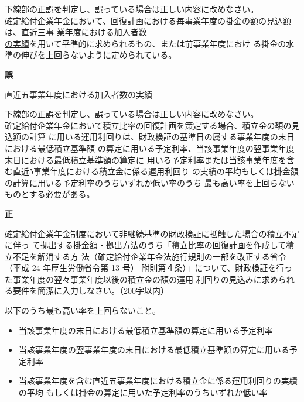 \begin{truefalse}[年金2 2019 問題1(1)\textcircled{4}]
  下線部の正誤を判定し、誤っている場合は正しい内容に改めなさい。
  \\

  確定給付企業年金において、回復計画における毎事業年度の掛金の額の見込額は、\underline{直近三事
業年度における加入者数}\\
\underline{の実績}を用いて平準的に求められるもの、または前事業年度におけ
る掛金の水準の伸びを上回らないように定められている。
\end{truefalse}

\begin{answerbox}
  \textbf{誤}

  直近五事業年度における加入者数の実績
\end{answerbox}

\begin{truefalse}[年金2 H28 問題1(1)\textcircled{2}]
  下線部の正誤を判定し、誤っている場合は正しい内容に改めなさい。
  \\

  確定給付企業年金において積立比率の回復計画を策定する場合、積立金の額の見込額の計算
  に用いる運用利回りは、財政検証の基準日の属する事業年度の末日における最低積立基準額
  の算定に用いる予定利率、当該事業年度の翌事業年度末日における最低積立基準額の算定に
  用いる予定利率または当該事業年度を含む直近5事業年度における積立金に係る運用利回り
  の実績の平均もしくは掛金額の計算に用いる予定利率のうちいずれか低い率のうち
  \underline{最も高い率}を上回らないものとする必要がある。
\end{truefalse}

\begin{answerbox}
  \textbf{正}
\end{answerbox}

\begin{shortanswer}[年金2 2023 問題2(5)]
  確定給付企業年金制度において非継続基準の財政検証に抵触した場合の積立不足に伴っ
て拠出する掛金額・拠出方法のうち「積立比率の回復計画を作成して積立不足を解消する方
法（確定給付企業年金法施行規則の一部を改正する省令（平成 24 年厚生労働省令第 13 号）
附則第４条）」について、財政検証を行った事業年度の翌々事業年度以後の積立金の額の運用
利回りの見込みに求められる要件を簡潔に入力しなさい。（200字以内）
\end{shortanswer}

\begin{answerbox}
  以下のうち最も高い率を上回らないこと。
  \begin{itemize}
    \item 当該事業年度の末日における最低積立基準額の算定に用いる予定利率
    \item 当該事業年度の翌事業年度の末日における最低積立基準額の算定に用いる予定利率
    \item 当該事業年度を含む直近五事業年度における積立金に係る運用利回りの実績の平均
    もしくは掛金の算定に用いた予定利率のうちいずれか低い率
  \end{itemize}
\end{answerbox}

